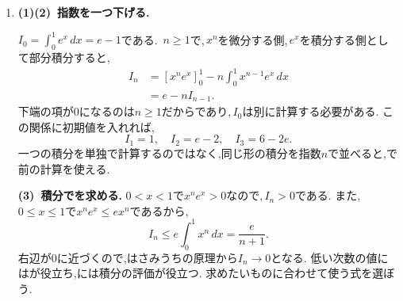 \begin{enumerate}[label=\textbf{問\arabic*.},leftmargin=3.8em,format=\bookitemlink{practice-bridge}{solution}{problem}]
                \smallskip
                \textbf{(3)~無限個の整数解を作る.}
                初期値が整数で,更新式の係数も整数だから,帰納法で$\displaystyle x_n,y_n$はすべて整数である.\,
                $\displaystyle n=1$ではどちらも正であり,更新式から$\displaystyle n\ge1$で正値が続く.
                さらに,
                \[
                  x_{n+1}-x_n=x_n+3y_n>0
                \]
                なので,同じ解は繰り返されない.
                (1)のからすべて$\displaystyle x^2-3y^2=1$を満たすため,正の整数解が無限個得られる.
                に無理数が含まれていても,整数性は元のから確実に分かる.
                このが,正の整数解を無限個生成する仕組みになっている.
          \item \textbf{(1)(2)~指数を一つ下げる.}\par\nobreak
                $\displaystyle I_0=\int_0^1e^x\,dx=e-1$である.\,
                $\displaystyle n\ge1$で,\,$\displaystyle x^n$を微分する側,\,$\displaystyle e^x$を積分する側として部分積分すると,
                \begin{align*}
                  I_n&=[x^ne^x]_0^1
                       -n\int_0^1x^{n-1}e^x\,dx\\
                     &=e-nI_{n-1}.
                \end{align*}
                下端の項が$\displaystyle 0$になるのは$\displaystyle n\ge1$だからであり,\,$\displaystyle I_0$は別に計算する必要がある.
                この関係に初期値を入れれば,
                \[
                  I_1=1,\quad I_2=e-2,\quad I_3=6-2e.
                \]
                一つの積分を単独で計算するのではなく,同じ形の積分を指数$\displaystyle n$で並べると,で前の計算を使える.

                \smallskip
                \textbf{(3)~積分でを求める.}
                $\displaystyle 0<x<1$で$\displaystyle x^ne^x>0$なので,\,$\displaystyle I_n>0$である.
                また,\,$\displaystyle 0\le x\le1$で$\displaystyle x^ne^x\le ex^n$であるから,
                \[
                  I_n\le e\int_0^1x^n\,dx=\frac{e}{n+1}.
                \]
                右辺が$\displaystyle 0$に近づくので,はさみうちの原理から$\displaystyle I_n\to0$となる.
                低い次数の値にはが役立ち,には積分の評価が役立つ.
                求めたいものに合わせて使う式を選ぼう.
        \end{enumerate}
